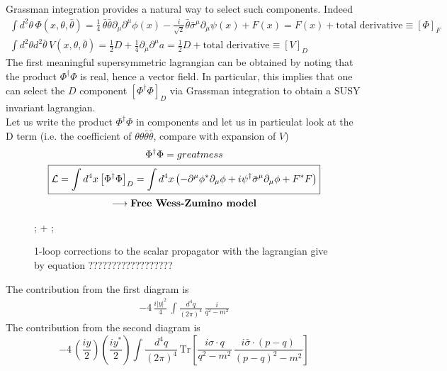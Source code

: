 \documentclass[12pt]{article}
\begin{document}
\newpage

Grassman integration provides a natural way to select such components. Indeed 
\begin{gather*}
  \int d^2\theta \, \Phi(x, \theta, \bar\theta) = \frac{1}{4} \, \bar\theta \bar\theta \partial_\mu \partial^\mu \phi(x) - \frac{i}{\sqrt{2}} \bar\theta \bar\sigma^\mu \partial_\mu \psi(x) + F(x) = F(x) + \text{total derivative} \equiv \left[\Phi\right]_F \\
  \int d^2\theta d^2\bar\theta \, V(x, \theta, \bar\theta) = \frac{1}{2} D + \frac{1}{4} \partial_\mu \partial^\mu a = \frac{1}{2} D + \text{total derivative} \equiv \left[V\right]_D
\end{gather*}
The first meaningful supersymmetric lagrangian can be obtained by noting that the product $\Phi^\dagger\Phi$ is real, hence a vector field. In particular, this implies that one can select the $D$ component $\left[\Phi^\dagger\Phi\right]_D$ via Grassman integration to obtain a SUSY invariant lagrangian. \\
Let us write the product $\Phi^\dagger\Phi$ in components and let us in particulat look at the D term (i.e. the coefficient of $\theta\theta\bar\theta\bar\theta$, compare with expansion of $V$)
\begin{gather*}
  \Phi^\dagger\Phi = great mess \\
  \boxed{\mathcal{L} = \int d^4 x \left[\Phi^\dagger\Phi\right]_D = \int d^4 x \left( -\partial^\mu \phi^* \partial_\mu \phi + i \psi^\dagger \bar\sigma^\mu \partial_\mu \phi + F^*F \right)} \\
  \longrightarrow \text{\bfseries Free Wess-Zumino model}
\end{gather*}



\newpage

\begin{figure}[h]
  \centering 
  ; 
\quad + \qquad
{};
\caption{1-loop corrections to the scalar propagator with the lagrangian give by equation ??????????????????}
\end{figure}
\raggedright The contribution from the first diagram is
\begin{gather*}
  -4 \,\frac{i|y|^2}{4} \, \int \frac{d^4 q}{(2\pi)^4} \, \frac{i}{q^2 - m^2}
\end{gather*}
The contribution from the second diagram is 
\begin{equation*}
  - 4 \, \left(\frac{iy}{2}\right)\left(\frac{iy^*}{2}\right) \int \frac{d^4 q}{(2\pi)^4} \, \text{Tr}\left[\frac{i\sigma \cdot q}{q^2 - m^2} \, \frac{i\bar\sigma \cdot (p-q)}{(p-q)^2 - m^2}\right]
\end{equation*}
\end{document}
